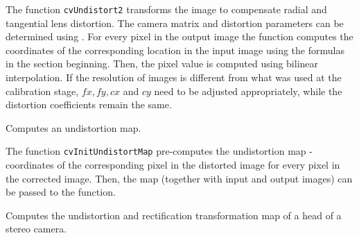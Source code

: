 \begin{description}
\end{description}

The function \texttt{cvUndistort2} transforms the image to compensate
radial and tangential lens distortion. The camera matrix and
distortion parameters can be determined using
. For every
pixel in the output image the function computes the coordinates of the
corresponding location in the input image using the formulas in the
section beginning. Then, the pixel value is computed using bilinear
interpolation. If the resolution of images is different from what
was used at the calibration stage, $fx, fy, cx$ and $cy$
need to be adjusted appropriately, while the distortion coefficients
remain the same.

\label{InitUndistortMap}

Computes an undistortion map.


\begin{description}
\end{description}

The function \texttt{cvInitUndistortMap} pre-computes the undistortion map - coordinates of the corresponding pixel in the distorted image for every pixel in the corrected image. Then, the map (together with input and output images) can be passed to the  function.


Computes the undistortion and rectification transformation map of a head of a stereo camera.


